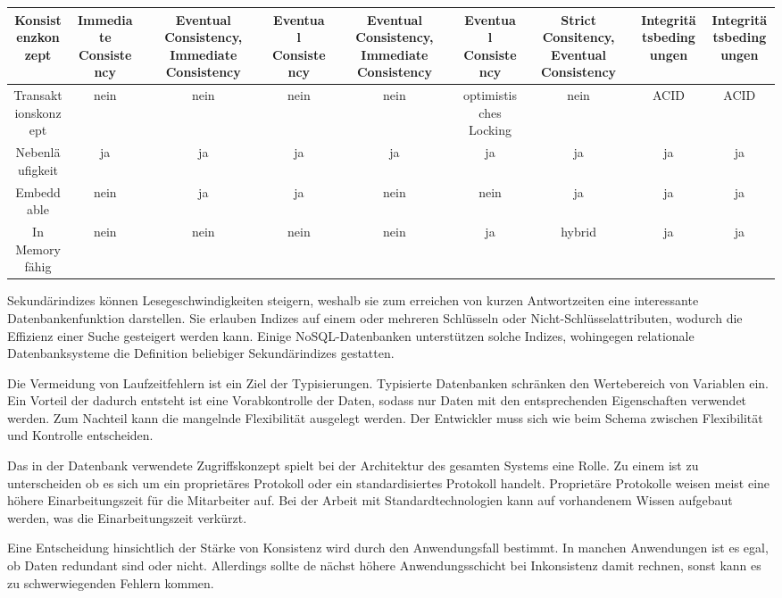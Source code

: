 \begin{table}[H]
\begin{tabulary} {\linewidth} {C | C | C | C | C | C | C | C | C}
\midrule
Konsistenzkonzept & Immediate Consistency & Eventual Consistency, Immediate Consistency & Eventual
Consistency & Eventual Consistency, Immediate Consistency & Eventual Consistency & Strict Consitency, Eventual Consistency &  Integritätsbedingungen & Integritätsbedingungen \\
\midrule
Transaktionskonzept & nein & nein & nein & nein & optimistisches Locking & nein & ACID & ACID \\
\midrule
Nebenläufigkeit & ja & ja & ja & ja & ja & ja & ja & ja \\
\midrule
Embeddable & nein & ja & ja & nein & nein & ja & ja & ja \\
\midrule
In Memory fähig & nein & nein & nein & nein & ja & hybrid & ja & ja \\
\bottomrule
\end{tabulary}
\end{table}

Sekundärindizes können Lesegeschwindigkeiten steigern, weshalb sie zum erreichen von kurzen Antwortzeiten eine interessante Datenbankenfunktion darstellen. Sie erlauben Indizes auf einem oder mehreren Schlüsseln oder Nicht-Schlüsselattributen, wodurch die Effizienz einer Suche gesteigert werden kann. Einige NoSQL-Datenbanken unterstützen solche Indizes, wohingegen relationale Datenbanksysteme die Definition beliebiger Sekundärindizes gestatten. 

Die Vermeidung von Laufzeitfehlern ist ein Ziel der Typisierungen. Typisierte Datenbanken schränken den Wertebereich von Variablen ein. Ein Vorteil der dadurch entsteht ist eine Vorabkontrolle der Daten, sodass nur Daten mit den entsprechenden Eigenschaften verwendet werden. Zum Nachteil kann die mangelnde Flexibilität ausgelegt werden. Der Entwickler muss sich wie beim Schema zwischen Flexibilität und Kontrolle entscheiden. 

Das in der Datenbank verwendete Zugriffskonzept spielt bei der Architektur des gesamten Systems eine Rolle. Zu einem ist zu unterscheiden ob es sich um ein proprietäres Protokoll oder ein standardisiertes Protokoll handelt. Proprietäre Protokolle weisen meist eine höhere Einarbeitungszeit für die Mitarbeiter auf. Bei der Arbeit mit Standardtechnologien kann auf vorhandenem Wissen aufgebaut werden, was die Einarbeitungszeit verkürzt. 

Eine Entscheidung hinsichtlich der Stärke von Konsistenz wird durch den Anwendungsfall bestimmt. In manchen Anwendungen ist es egal, ob Daten redundant sind oder nicht. Allerdings sollte de nächst höhere Anwendungsschicht bei Inkonsistenz damit rechnen, sonst kann es zu schwerwiegenden Fehlern kommen.

